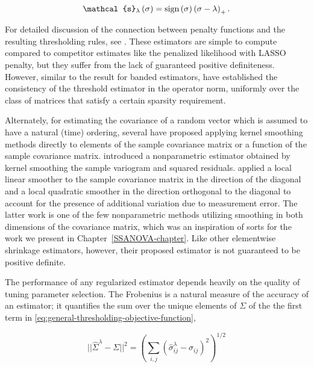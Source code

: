 \begin{equation} 
\mathcal{s}_\lambda\left( \sigma \right) = \textup{sign}\left(\sigma\right) \left(\sigma  - \lambda\right)_+.
\end{equation}

\noindent
For detailed discussion of the connection between penalty functions and the resulting thresholding rules, see \cite{antoniadis2001regularization}. These estimators are simple to compute compared to competitor estimates like the penalized likelihood with LASSO penalty, but they suffer from the lack of guaranteed positive definiteness. However, similar to the result for banded estimators, \cite{bickel2008covariance} have established the consistency of the threshold estimator in the operator norm, uniformly over the class of matrices that satisfy a certain sparsity requirement. 


\bigskip

Alternately, for estimating the covariance of a random vector which is assumed to have a natural (time) ordering, several have proposed applying kernel smoothing methods directly to elements of the sample covariance matrix or a function of the sample covariance matrix. \cite{zeger1994semiparametric} introduced a nonparametric estimator obtained by kernel smoothing the sample variogram and squared residuals.  \cite{yao2005functional} applied a local linear smoother to the sample covariance matrix in the direction of the diagonal and a local quadratic smoother in the direction orthogonal to the diagonal to account for the presence of additional variation due to measurement error. The latter work is one of the few nonparametric methods utilizing smoothing in both dimensions of the covariance matrix, which was an inspiration of sorts for the work we present in Chapter~\ref{SSANOVA-chapter}. Like other elementwise shrinkage estimators, however, their proposed estimator is not guaranteed to be positive definite. 

\bigskip

The performance of any regularized estimator depends heavily on the quality of tuning parameter selection. The Frobenius is a natural measure of the accuracy of an estimator; it quantifies the sum over the unique elements of $\Sigma$ of the the first term in \ref{eq:general-thresholding-objective-function}, 

\begin{equation} \label{eq:frobenius-norm}
\vert \vert  \hat{\Sigma}^\lambda - \Sigma \vert \vert^2 = \left(\sum_{i,j} \left(\hat{\sigma}^\lambda_{ij} - \sigma_{ij} \right)^2\right)^{1/2}
\end{equation}
\noindent

